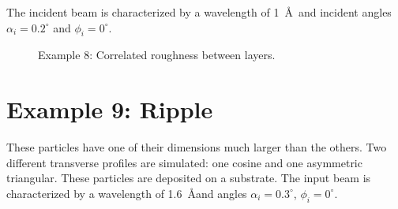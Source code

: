 The incident beam is characterized by a wavelength of 1~\AA \ and incident angles $\alpha_i=0.2^{\circ}$ and $\phi_i=0^{\circ}$. 
\begin{figure}[H]
\hfill
{}
\hfill
{}
\hfill
\caption{Example 8: Correlated roughness between layers.}
\label{fig:PythonEx8Rough}
\end{figure}

 
\newpage
\section{Example 9: Ripple}
These particles have one of their dimensions much larger than the others.
Two different transverse profiles are simulated: one cosine and one asymmetric triangular.
These particles are deposited on a substrate. The input beam is characterized by a wavelength of 1.6~\AA and angles $\alpha_i=0.3^{\circ}$, $\phi_i=0^{\circ}$.

